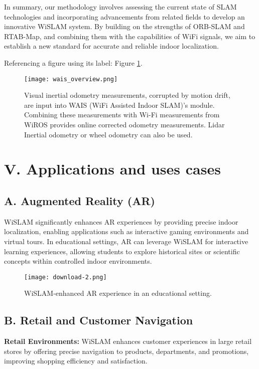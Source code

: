 \documentclass[
	a4paper, %
	11pt, %
	unnumberedsections, %
	twoside, %
]{LTJournalArticle}
\begin{document}
In summary, our methodology involves assessing the current state of SLAM technologies and incorporating advancements from related fields to develop an innovative WiSLAM system. By building on the strengths of ORB-SLAM and RTAB-Map, and combining them with the capabilities of WiFi signals, we aim to establish a new standard for accurate and reliable indoor localization.

Referencing a figure using its label: Figure \ref{fig:tcanther}.

\begin{figure} %
	\texttt{[image: wais\_overview.png]}
	\caption{Visual inertial odometry measurements, corrupted by motion drift, are input into WAIS (WiFi Assisted Indoor SLAM)'s module. Combining these measurements with Wi-Fi measurements from WiROS provides online corrected odometry measurements. Lidar Inertial odometry or wheel odometry can also be used.}	\label{fig:tcanther}
\end{figure}

\section{V.	Applications and uses cases}

\subsection{A.	Augmented Reality (AR)}
WiSLAM significantly enhances AR experiences by providing precise indoor localization, enabling applications such as interactive gaming environments and virtual tours. In educational settings, AR can leverage WiSLAM for interactive learning experiences, allowing students to explore historical sites or scientific concepts within controlled indoor environments.

\begin{figure}[h]
    \centering
    \texttt{[image: download-2.png]}
    \caption{WiSLAM-enhanced AR experience in an educational setting.}
    \label{fig:download}
\end{figure}

\subsection{B.	Retail and Customer Navigation}
\textbf{Retail Environments:} WiSLAM enhances customer experiences in large retail stores by offering precise navigation to products, departments, and promotions, improving shopping efficiency and satisfaction.
\end{document}
